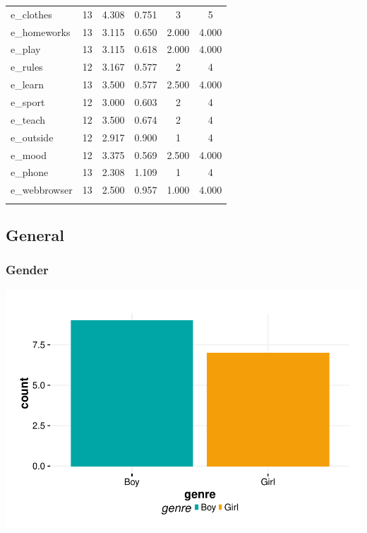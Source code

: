 \documentclass{article}
\begin{document}
\begin{table}[!htbp]
\begin{tabular}{@{\extracolsep{5pt}}lccccc}
e\_clothes & 13 & 4.308 & 0.751 & 3 & 5 \\ 
e\_homeworks & 13 & 3.115 & 0.650 & 2.000 & 4.000 \\ 
e\_play & 13 & 3.115 & 0.618 & 2.000 & 4.000 \\ 
e\_rules & 12 & 3.167 & 0.577 & 2 & 4 \\ 
e\_learn & 13 & 3.500 & 0.577 & 2.500 & 4.000 \\ 
e\_sport & 12 & 3.000 & 0.603 & 2 & 4 \\ 
e\_teach & 12 & 3.500 & 0.674 & 2 & 4 \\ 
e\_outside & 12 & 2.917 & 0.900 & 1 & 4 \\ 
e\_mood & 12 & 3.375 & 0.569 & 2.500 & 4.000 \\ 
e\_phone & 13 & 2.308 & 1.109 & 1 & 4 \\ 
e\_webbrowser & 13 & 2.500 & 0.957 & 1.000 & 4.000 \\ 
\hline \\[-1.8ex] 
\end{tabular} 
\end{table} 
\subsection{General}

\subsubsection{Gender}
\includegraphics{interviews-plot_gender}
\end{document}
